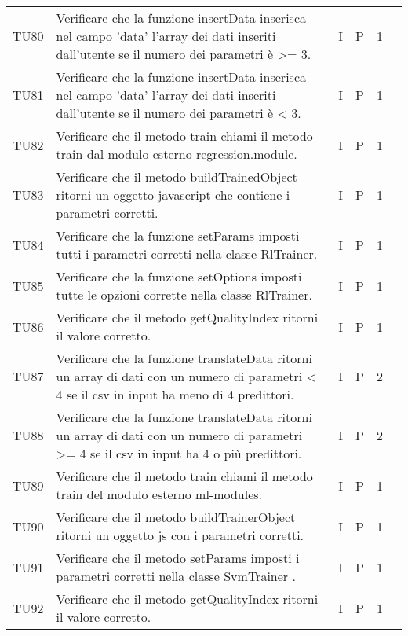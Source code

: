 \begin{longtable} {
		>{}p{12mm}
		>{}p{79.5mm}
		>{}p{9mm}
		>{}p{8mm}
		>{}p{14mm}
		>{}p{0mm}}
	TU80		& Verificare che la funzione insertData inserisca nel campo 'data' l'array dei dati inseriti dall'utente se il numero dei parametri è >= 3. & I & P & 1 & \TBstrut \\ [2mm]
	TU81		& Verificare che la funzione insertData inserisca nel campo 'data' l'array dei dati inseriti dall'utente se il numero dei parametri è < 3. & I & P & 1 & \TBstrut \\ [2mm]
	TU82		& Verificare che il metodo train chiami il metodo train dal modulo esterno regression.module. & I & P & 1 & \TBstrut \\ [2mm]
	TU83		& Verificare che il metodo buildTrainedObject ritorni un oggetto javascript che contiene i parametri corretti. & I & P & 1 & \TBstrut \\ [2mm]
	TU84		& Verificare che la funzione setParams imposti tutti i parametri corretti nella classe RlTrainer. & I & P & 1 & \TBstrut \\ [2mm]
	TU85		& Verificare che la funzione setOptions imposti tutte le opzioni corrette nella classe RlTrainer. & I & P & 1 & \TBstrut \\ [2mm]
	TU86		& Verificare che il metodo getQualityIndex ritorni il valore corretto. & I & P & 1 & \TBstrut \\ [2mm]
	TU87		& Verificare che la funzione translateData ritorni un array di dati con un numero di parametri < 4 se il csv in input ha meno di 4 predittori. & I & P & 2 & \TBstrut \\ [2mm]
	TU88		& Verificare che la funzione translateData ritorni un array di dati con un numero di parametri >= 4 se il csv in input ha 4 o più predittori. & I & P & 2 & \TBstrut \\ [2mm]
	TU89		& Verificare che il metodo train chiami il metodo train del modulo esterno ml-modules. & I & P & 1 & \TBstrut \\ [2mm]
	TU90		& Verificare che il metodo buildTrainerObject ritorni un oggetto js con i parametri corretti. & I & P & 1 & \TBstrut \\ [2mm]
	TU91		& Verificare che il metodo setParams imposti i parametri corretti nella classe SvmTrainer . & I & P & 1 & \TBstrut \\ [2mm]
	TU92		& Verificare che il metodo getQualityIndex ritorni il valore corretto. & I & P & 1 & \TBstrut \\ [2mm]


\end{longtable}
